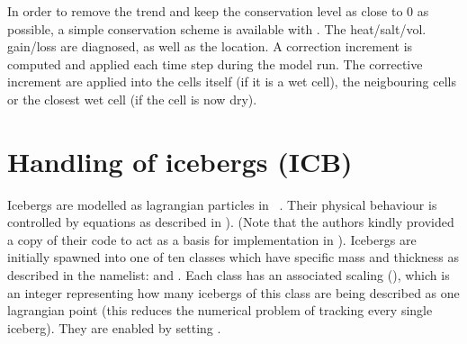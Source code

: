 \documentclass[../main/NEMO_manual]{subfiles}
\begin{document}
In order to remove the trend and keep the conservation level as close to 0 as possible,
a simple conservation scheme is available with .
The heat/salt/vol. gain/loss are diagnosed, as well as the location.
A correction increment is computed and applied each time step during the model run.
The corrective increment are applied into the cells itself (if it is a wet cell), the neigbouring cells or the closest wet cell (if the cell is now dry).

\section{Handling of icebergs (ICB)}
\label{sec:SBC_ICB_icebergs}

\begin{listing}
  \caption{}
  \label{lst:namberg}
\end{listing}

Icebergs are modelled as lagrangian particles in \NEMO\ \citep{marsh.ivchenko.ea_GMD15}.
Their physical behaviour is controlled by equations as described in \citet{martin.adcroft_OM10} ).
(Note that the authors kindly provided a copy of their code to act as a basis for implementation in \NEMO).
Icebergs are initially spawned into one of ten classes which have specific mass and thickness as
described in the  namelist:  and .
Each class has an associated scaling (),
which is an integer representing how many icebergs of this class are being described as one lagrangian point
(this reduces the numerical problem of tracking every single iceberg).
They are enabled by setting .
\end{document}
